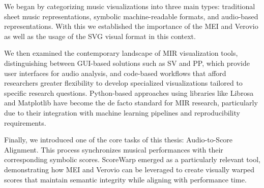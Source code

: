 We began by categorizing music visualizations into three main types: traditional sheet music representations, symbolic machine-readable formats, and audio-based representations. With this we established the importance of the \ac{MEI} and Verovio as well as the usage of the \ac{SVG} visual format in this context.

We then examined the contemporary landscape of \ac{MIR} visualization tools, distinguishing between \ac{GUI}-based solutions such as \ac{SV} and \ac{PP}, which provide user interfaces for audio analysis, and code-based workflows that afford researchers greater flexibility to develop specialized visualizations tailored to specific research questions. Python-based approaches using libraries like Librosa and Matplotlib have become the de facto standard for \ac{MIR} research, particularly due to their integration with machine learning pipelines and reproducibility requirements.

Finally, we introduced one of the core tasks of this thesis: Audio-to-Score Alignment. This process synchronizes musical performances with their corresponding symbolic scores. ScoreWarp emerged as a particularly relevant tool, demonstrating how \ac{MEI} and Verovio can be leveraged to create visually warped scores that maintain semantic integrity while aligning with performance time.

